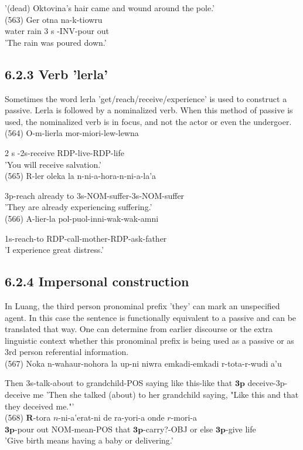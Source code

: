 \documentclass[10pt]{article}
\begin{document}
'(dead) Oktovina's hair came and wound around the pole.'\\
(563) Ger otna na-k-tiowru\\
water rain 3 s -INV-pour out\\
'The rain was poured down.'

\subsection*{6.2.3 Verb 'lerla'}
Sometimes the word lerla 'get/reach/receive/experience' is used to construct a passive. Lerla is followed by a nominalized verb. When this method of passive is used, the nominalized verb is in focus, and not the actor or even the undergoer.\\
(564) O-m-lierla mor-miori-lew-lewna

2 s -2s-receive RDP-live-RDP-life\\
'You will receive salvation.'\\
(565) R-ler oleka la n-ni-a-hora-n-ni-a-la'a

3p-reach already to 3s-NOM-suffer-3s-NOM-suffer\\
'They are already experiencing suffering.'\\
(566) A-lier-la pol-puol-inni-wak-wak-amni

1s-reach-to RDP-call-mother-RDP-ask-father\\
'I experience great distress.'

\subsection*{6.2.4 Impersonal construction}
In Luang, the third person pronominal prefix 'they' can mark an unspecified agent. In this case the sentence is functionally equivalent to a passive and can be translated that way. One can determine from earlier discourse or the extra linguistic context whether this pronominal prefix is being used as a passive or as 3rd person referential information.\\
(567) Noka n-wahaur-nohora la up-ni niwra emkadi-emkadi r-tota-r-wudi a'u

Then 3s-talk-about to grandchild-POS saying like this-like that \(\mathbf{3 p}\) deceive-3p-deceive me 'Then she talked (about) to her grandchild saying, "Like this and that they deceived me."'\\
(568) \(\boldsymbol{R}\)-tora \(n\)-ni-a'erat-ni de ra-yori-a onde \(r\)-mori-a\\
\(\mathbf{3 p}\)-pour out NOM-mean-POS that \(\mathbf{3 p}\)-carry?-OBJ or else \(\mathbf{3 p}\)-give life\\
'Give birth means having a baby or delivering.'
\end{document}
